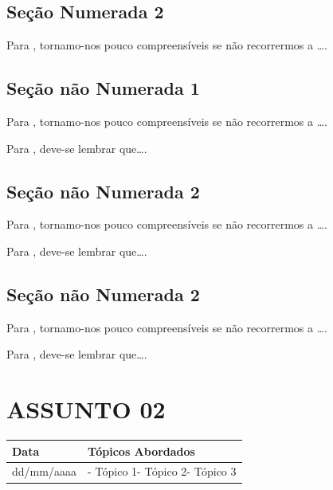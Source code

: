 \documentclass[
]{book}
\begin{document}
\hypertarget{seuxe7uxe3o-numerada-2}{%
\subsection{Seção Numerada 2}\label{seuxe7uxe3o-numerada-2}}

Para \citet{BOCK2001}, tornamo-nos pouco compreensíveis se não recorrermos a \ldots.

\hypertarget{seuxe7uxe3o-nuxe3o-numerada-1-1}{%
\subsection*{Seção não Numerada 1}\label{seuxe7uxe3o-nuxe3o-numerada-1-1}}

Para \citet{BOCK2001}, tornamo-nos pouco compreensíveis se não recorrermos a \ldots.

Para \citet{DAVIDOFF2001}, deve-se lembrar que\ldots.

\hypertarget{seuxe7uxe3o-nuxe3o-numerada-2-1}{%
\subsection*{Seção não Numerada 2}\label{seuxe7uxe3o-nuxe3o-numerada-2-1}}

Para \citet{BOCK2001}, tornamo-nos pouco compreensíveis se não recorrermos a \ldots.

Para \citet{DAVIDOFF2001}, deve-se lembrar que\ldots.

\hypertarget{seuxe7uxe3o-nuxe3o-numerada-2-2}{%
\subsection*{Seção não Numerada 2}\label{seuxe7uxe3o-nuxe3o-numerada-2-2}}

Para \citet{BOCK2001}, tornamo-nos pouco compreensíveis se não recorrermos a \ldots.

Para \citet{DAVIDOFF2001}, deve-se lembrar que\ldots.

\hypertarget{assunto-02}{%
\section{ASSUNTO 02}\label{assunto-02}}

\begin{longtable}[]{@{}ll@{}}
\toprule()
Data & Tópicos Abordados \\
\midrule()
\endhead
dd/mm/aaaa & - Tópico 1- Tópico 2- Tópico 3 \\
\bottomrule()
\end{longtable}
\end{document}
